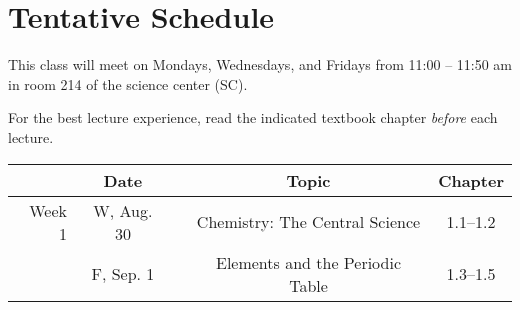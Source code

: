 \documentclass[12pt, letterpaper]{article}
\begin{document}
\section*{Tentative Schedule}
This class will meet on Mondays, Wednesdays, and Fridays from 11:00  -- 11:50
am in room 214 of the science center (SC).


\noindent For the best lecture experience, read the indicated textbook chapter \emph{before} each lecture.

\noindent
\begin{tabular}{rcccc}
& Date && Topic & Chapter\\
\midrule
Week 1 & W, Aug. 30&& Chemistry: The Central Science & 1.1--1.2\\
& F, Sep. 1&& Elements and the Periodic Table & 1.3--1.5\\
\end{tabular}
\end{document}
